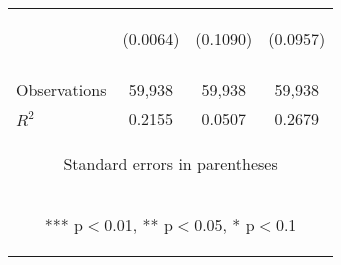 \begin{center}
\begin{tabular}{lccc}
 & \begin{footnotesize}(0.0064)\end{footnotesize} & \begin{footnotesize}(0.1090)\end{footnotesize} & \begin{footnotesize}(0.0957)\end{footnotesize} \\
\vspace{4pt} & \begin{footnotesize}\end{footnotesize} & \begin{footnotesize}\end{footnotesize} & \begin{footnotesize}\end{footnotesize} \\
Observations & 59,938 & 59,938 & 59,938 \\
 $R^2$ & 0.2155 & 0.0507 & 0.2679 \\ \hline
\multicolumn{4}{c}{\begin{footnotesize} Standard errors in parentheses\end{footnotesize}} \\
\multicolumn{4}{c}{\begin{footnotesize} *** p$<$0.01, ** p$<$0.05, * p$<$0.1\end{footnotesize}} \\
\end{tabular}
\end{center}
